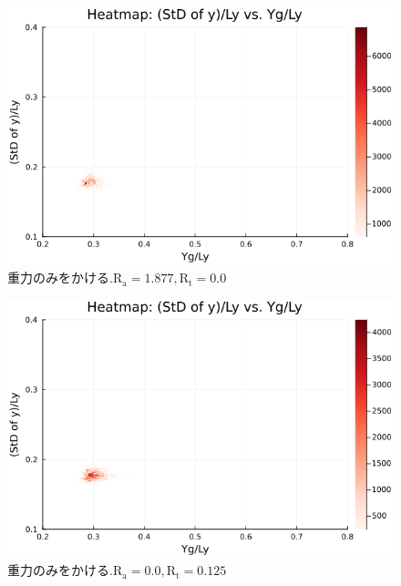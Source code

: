 \begin{figure}[H]
  \centering
  \includegraphics[scale=0.6]{image/dT0_heat/2024-01-15T14:30:47.119_mapg0_chi0_Ay50_rho0.4_T0.43_dT0.0_Rd0.0_Rt0.0_Ra1.877538_g0.0003999718779659611_run4.0e7.png}
  \caption{$重力のみをかける. \text{R}_\text{a}=1.877,\text{R}_\text{t}=0.0$}
  \label{}
\end{figure}

\begin{figure}[H]
  \centering
  \includegraphics[scale=0.6]{image/dT0_heat/2024-01-15T14:30:47.186_mapg0_chi0_Ay50_rho0.4_T0.43_dT0.0_Rd0.0_Rt0.125_Ra0.0_g0.0003999718779659611_run4.0e7.png}
  \caption{$重力のみをかける. \text{R}_\text{a}=0.0,\text{R}_\text{t}=0.125$}
  \label{}
\end{figure}

